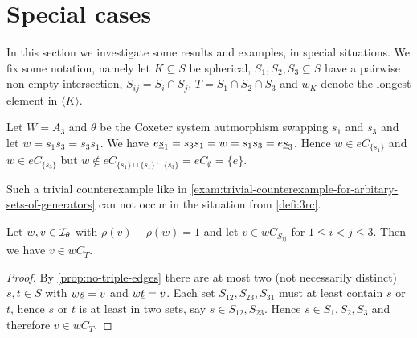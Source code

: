 \section{Special cases}
\label{sec:3rc-special-cases}

%
%		

In this section we investigate some results and examples, in special situations. We fix some notation, namely let $K \subseteq S$ be spherical, $S_1,S_2,S_3 \subseteq S$ have a pairwise non-empty intersection, $S_{ij} = S_i \cap S_j$, $T = S_1 \cap S_2 \cap S_3$ and $w_K$ denote the longest element in $\langle K \rangle$.

\begin{exam}
	Let $W = A_3$ and $\theta$ be the Coxeter system autmorphism swapping $s_1$ and $s_3$ and let $w = s_1s_3 = s_3s_1$. We have $e \underline{s}_1 = s_3 s_1 = w = s_1 s_3 = e \underline{s}_3$. Hence $w \in eC_{\{s_1\}}$ and $w \in eC_{\{s_3\}}$ but $w \notin eC_{\{s_1\} \cap \{s_1\} \cap \{s_3\}} = eC_\emptyset = \{e\}$.
\end{exam}

Such a trivial counterexample like in \ref{exam:trivial-counterexample-for-arbitary-sets-of-generators} can not occur in the situation from \ref{defi:3rc}.

\begin{prop}
	Let $w,v \in \mathcal{I}_{\theta}$ with $\rho(v) - \rho(w) = 1$ and let $v \in w C_{S_{ij}}$ for $1 \leq i < j \leq 3$. Then we have $v \in wC_T$.

	\begin{proof}
		By \ref{prop:no-triple-edges} there are at most two (not necessarily distinct) $s,t \in S$ with $w \underline{s} = v$ and $w \underline{t} = v$. Each set $S_{12},S_{23},S_{31}$ must at least contain $s$ or $t$, hence $s$ or $t$ is at least in two sets, say $s \in S_{12},S_{23}$. Hence $s \in S_1,S_2,S_3$ and therefore $v \in wC_T$.
	\end{proof}
\end{prop}


